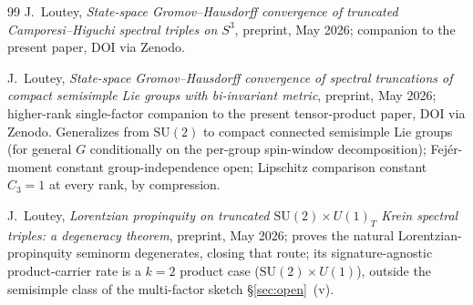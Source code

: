 \documentclass[11pt,a4paper]{article}
\theoremstyle{plain}
\theoremstyle{definition}
\newcommand{\SU}{\mathrm{SU}}
\begin{document}
\begin{thebibliography}{99}
J.~Loutey,
\newblock \emph{State-space Gromov--Hausdorff convergence of truncated
Camporesi--Higuchi spectral triples on $S^3$},
\newblock preprint, May 2026; companion to the present paper, DOI via
Zenodo.

J.~Loutey,
\newblock \emph{State-space Gromov--Hausdorff convergence of spectral
truncations of compact semisimple Lie groups with bi-invariant metric},
\newblock preprint, May 2026; higher-rank single-factor companion to
the present tensor-product paper, DOI via Zenodo.
\newblock Generalizes \cite{loutey_paper38} from $\SU(2)$ to compact
connected semisimple Lie groups (for general $G$ conditionally on the
per-group spin-window decomposition); Fej\'er-moment constant
group-independence open; Lipschitz comparison constant
$C_3 = 1$ at every rank, by compression.

J.~Loutey,
\newblock \emph{Lorentzian propinquity on truncated
$\SU(2) \times U(1)_{T}$ Krein spectral triples: a degeneracy theorem},
\newblock preprint, May 2026; proves the natural Lorentzian-propinquity
seminorm degenerates, closing that route; its signature-agnostic
product-carrier rate is a $k = 2$ product case ($\SU(2) \times U(1)$),
outside the semisimple class of the multi-factor sketch
\S\ref{sec:open}~(v).

\end{thebibliography}
\end{document}

